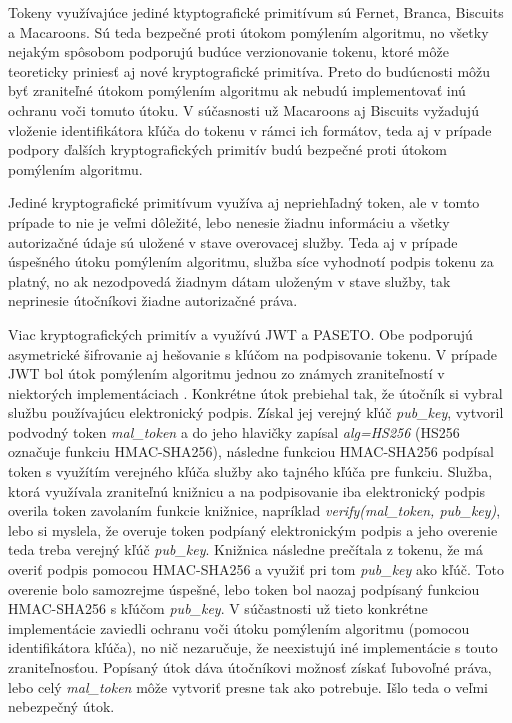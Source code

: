 Tokeny využívajúce jediné ktyptografické primitívum sú Fernet, Branca, Biscuits a Macaroons. Sú teda bezpečné proti útokom pomýlením algoritmu, no všetky nejakým spôsobom podporujú budúce verzionovanie tokenu, ktoré môže teoreticky priniesť aj nové kryptografické primitíva. Preto do budúcnosti môžu byť zraniteľné útokom pomýlením algoritmu ak nebudú implementovať inú ochranu voči tomuto útoku. V súčasnosti už Macaroons aj Biscuits vyžadujú vloženie identifikátora kľúča do tokenu v rámci ich formátov, teda aj v prípade podpory ďalších kryptografických primitív budú bezpečné proti útokom pomýlením algoritmu.

Jediné kryptografické primitívum využíva aj nepriehľadný token, ale v tomto prípade to nie je veľmi dôležité, lebo nenesie žiadnu informáciu a všetky autorizačné údaje sú uložené v stave overovacej služby. Teda aj v prípade úspešného útoku pomýlením algoritmu, služba síce vyhodnotí podpis tokenu za platný, no ak nezodpovedá žiadnym dátam uloženým v stave služby, tak neprinesie útočníkovi žiadne autorizačné práva.

Viac kryptografických primitív a využívú JWT a PASETO. Obe podporujú asymetrické šifrovanie aj hešovanie s kľúčom na podpisovanie tokenu. V prípade JWT bol útok pomýlením algoritmu jednou zo známych zraniteľností v niektorých implementáciach \cite{jwt_vul}. Konkrétne útok prebiehal tak, že útočník si vybral službu používajúcu elektronický podpis. Získal jej verejný kľúč \textit{pub\_key}, vytvoril podvodný token \textit{mal\_token} a do jeho hlavičky zapísal \textit{alg=HS256} (HS256 označuje funkciu HMAC-SHA256), následne funkciou HMAC-SHA256 podpísal token s využítím verejného kľúča služby ako tajného kľúča pre funkciu. Služba, ktorá využívala zraniteľnú knižnicu a na podpisovanie iba elektronický podpis overila token zavolaním funkcie knižnice, napríklad \textit{verify(mal\_token, pub\_key)}, lebo si myslela, že overuje token podpíaný elektronickým podpis a jeho overenie teda treba verejný kľúč \textit{pub\_key}. Knižnica následne prečítala z tokenu, že má overiť podpis pomocou HMAC-SHA256 a využiť pri tom \textit{pub\_key} ako kľúč. Toto overenie bolo samozrejme úspešné, lebo token bol naozaj podpísaný funkciou HMAC-SHA256 s kľúčom \textit{pub\_key}. V súčastnosti už tieto konkrétne implementácie zaviedli ochranu voči útoku pomýlením algoritmu (pomocou identifikátora kľúča), no nič nezaručuje, že neexistujú iné implementácie s touto zraniteľnosťou. Popísaný útok dáva útočníkovi možnosť získať ľubovoľné práva, lebo celý \textit{mal\_token} môže vytvoriť presne tak ako potrebuje. Išlo teda o veľmi nebezpečný útok.


